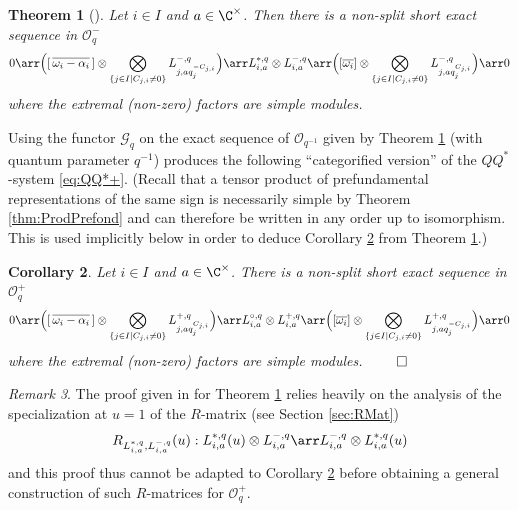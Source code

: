 \documentclass[11pt]{amsart}
\newtheorem{theorem}{Theorem}[section]
\newtheorem{cor}[theorem]{Corollary}
\theoremstyle{definition}
\theoremstyle{remark}
\newtheorem{rem}[theorem]{Remark}
\numberwithin{equation}{section}
\begin{document}
\begin{theorem}[{\cite[Theorem 5.16]{her}}]\label{thm:QQ*} Let $i\in I$ and $a\in \C^{\times}$. Then there is a non-split short exact sequence in $\mathcal{O}_q^-$
$$ 0\arr \Big( [\,\overline{\omega_i-\alpha_i}\,]\otimes \bigotimes_{\{j\in I| C_{j,i}\neq 0\}} L_{j,aq_j^{-C_{j,i}}}^{-,q}\Big)\arr L_{i,a}^{*,q}\otimes L_{i,a}^{-,q} \arr \Big([\overline{\omega_i}]\otimes \bigotimes_{\{j\in I| C_{j,i}\neq 0\}} L_{j,aq_j^{C_{j,i}}}^{-,q}\Big)\arr 0 $$
where the extremal (non-zero) factors are simple modules.
\end{theorem}
Using the functor $\mathcal{G}_q$ on the exact sequence of $\mathcal{O}_{q^{-1}}$ given by Theorem \ref{thm:QQ*} (with quantum parameter $q^{-1}$) produces the following ``categorified version'' of the $QQ^*$-system \eqref{eq:QQ*+}. (Recall that a tensor product of prefundamental representations of the same sign is necessarily simple by Theorem \ref{thm:ProdPrefond} and can therefore be written in any order up to isomorphism. This is used implicitly below in order to deduce Corollary \ref{cor:QQ*} from Theorem \ref{thm:QQ*}.)
\begin{cor}\label{cor:QQ*} Let $i\in I$ and $a\in \C^{\times}$. There is a non-split short exact sequence in $\mathcal{O}_q^+$
$$ 0\arr \Big( [\,\overline{\omega_i-\alpha_i}\,]\otimes \bigotimes_{\{j\in I| C_{j,i}\neq 0\}} L_{j,aq_j^{C_{j,i}}}^{+,q}\Big)\arr L_{i,a}^{\circ,q}\otimes L_{i,a}^{+,q} \arr \Big([\overline{\omega_i}]\otimes \bigotimes_{\{j\in I| C_{j,i}\neq 0\}} L_{j,aq_j^{-C_{j,i}}}^{+,q}\Big)\arr 0 $$
where the extremal (non-zero) factors are simple modules. \hfill $\qed$
\end{cor}
\begin{rem} The proof given in \cite{her} for Theorem \ref{thm:QQ*} relies heavily on the analysis of the specialization at $u=1$ of the $R$-matrix (see Section \ref{sec:RMat}) $$R_{L_{i,a}^{*,q},L_{i,a}^{-,q}}(u) : L_{i,a}^{*,q}(u)\otimes L_{i,a}^{-,q} \arr L_{i,a}^{-,q}\otimes L_{i,a}^{*,q}(u)$$
and this proof thus cannot be adapted to Corollary \ref{cor:QQ*} before obtaining a general construction of such $R$-matrices for $\mathcal{O}_q^+$.
\end{rem}
\end{document}
